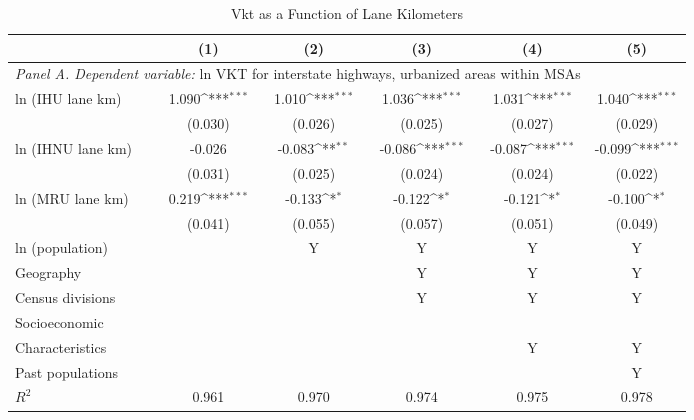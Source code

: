           \begin{table}[htbp]\centering         {}         \caption{Vkt as a Function of Lane Kilometers}         \begin{tabular}{l*{5}{c}}         \hline\hline                 
                    &\multicolumn{1}{c}{(1)}         &\multicolumn{1}{c}{(2)}         &\multicolumn{1}{c}{(3)}         &\multicolumn{1}{c}{(4)}         &\multicolumn{1}{c}{(5)}         \\
 \hline \multicolumn{5}{l}{ \emph{Panel A. Dependent variable:} ln VKT for interstate highways, urbanized areas within MSAs} \\ 
ln (IHU lane km)    &       1.090\sym{***}&       1.010\sym{***}&       1.036\sym{***}&       1.031\sym{***}&       1.040\sym{***}\\
                    &     (0.030)         &     (0.026)         &     (0.025)         &     (0.027)         &     (0.029)         \\
[1em]
ln (IHNU lane km)   &      -0.026         &      -0.083\sym{**} &      -0.086\sym{***}&      -0.087\sym{***}&      -0.099\sym{***}\\
                    &     (0.031)         &     (0.025)         &     (0.024)         &     (0.024)         &     (0.022)         \\
[1em]
ln (MRU lane km)    &       0.219\sym{***}&      -0.133\sym{*}  &      -0.122\sym{*}  &      -0.121\sym{*}  &      -0.100\sym{*}  \\
                    &     (0.041)         &     (0.055)         &     (0.057)         &     (0.051)         &     (0.049)         \\
           ln (population) &  & Y & Y & Y & Y \\            Geography &  &  & Y & Y & Y \\            Census divisions &  &  & Y & Y & Y \\            Socioeconomic           \\Characteristics &  &  &  & Y & Y \\            Past populations & & & & & Y \\                 
\(R^{2}\)           &       0.961         &       0.970         &       0.974         &       0.975         &       0.978         \\
 

\end{tabular}
\end{table}
